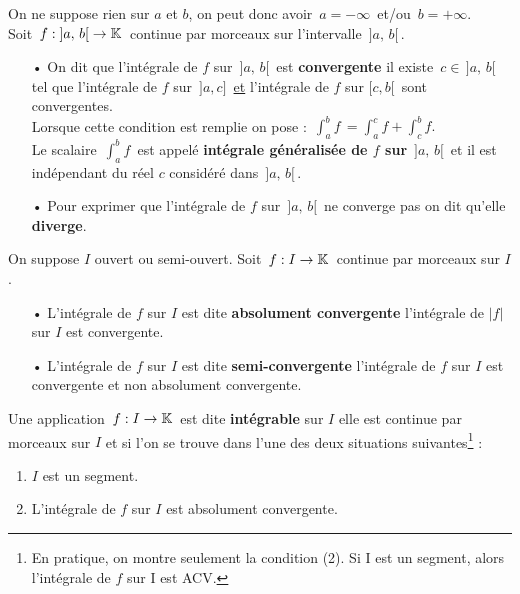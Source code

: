 On ne suppose rien sur $a$ et $b$, on peut donc avoir \(\,a=-\infty\,\) et/ou \(\,b=+\infty\).\vspace{0.2cm}\\
Soit \(\,f:\;]a,\,b[\;\to\mathbb{K}\,\) continue par morceaux sur l'intervalle \(\,]a,\,b[\,\).
\begin{itemize}[leftmargin=0.5cm]
    \item[•] On dit que l'intégrale de $f$ sur \(\,]a,\,b[\,\) est \textbf{convergente} \ssi il existe \(\,c\in\,]a,\,b[\,\) tel que l'intégrale de $f$ sur \(\,]a,c]\,\) \underline{et} l'intégrale de $f$ sur \([c, b[\,\) sont convergentes.\vspace{0.1cm}\\
    Lorsque cette condition est remplie on pose : \(\,\displaystyle \int_{a}^{b}\!f\,=\int_{a}^{c}\!f+\int_{c}^{b}\!f.\)\vspace{0.1cm}\\
    Le scalaire \(\,\displaystyle\int_{a}^{b}\!f\,\) est appelé \textbf{intégrale généralisée de $f$ sur} \(\,]a,\,b[\,\) et il est indépendant du réel $c$ considéré dans \(\,]a,\,b[\,\).\vspace{0.4cm}

    \item[•] Pour exprimer que l'intégrale de $f$ sur \(\,]a,\,b[\,\) ne converge pas on dit qu'elle \textbf{diverge}.
\end{itemize}

\vspace{1.5cm}

\noindent On suppose $I$ ouvert ou semi-ouvert. Soit \(\,f:I\to\mathbb{K}\,\) continue par morceaux sur $I$.
\begin{itemize}
    \item[•] L'intégrale de $f$ sur $I$ est dite \textbf{absolument convergente} \ssi l'intégrale de $|f|$ sur $I$ est convergente.
    
    \item[•] L'intégrale de $f$ sur $I$ est dite \textbf{semi-convergente} \ssi l'intégrale de $f$ sur $I$ est convergente et non absolument convergente.
\end{itemize}

\vspace{1.5cm}

Une application \(\,f:I\to\mathbb{K}\,\) est dite \textbf{intégrable} sur $I$ \ssi elle est continue par morceaux sur $I$ et si l'on se trouve dans l'une des deux situations suivantes\footnote{En pratique, on montre seulement la condition (2). Si I est un segment, alors l'intégrale de $f$ sur I est ACV.} :
\begin{enumerate}[leftmargin=6cm,label=(\arabic*)\;]
    \item $I$ est un segment.
    
    \item L'intégrale de $f$ sur $I$ est absolument convergente.
\end{enumerate}
\vspace{0.3cm}

